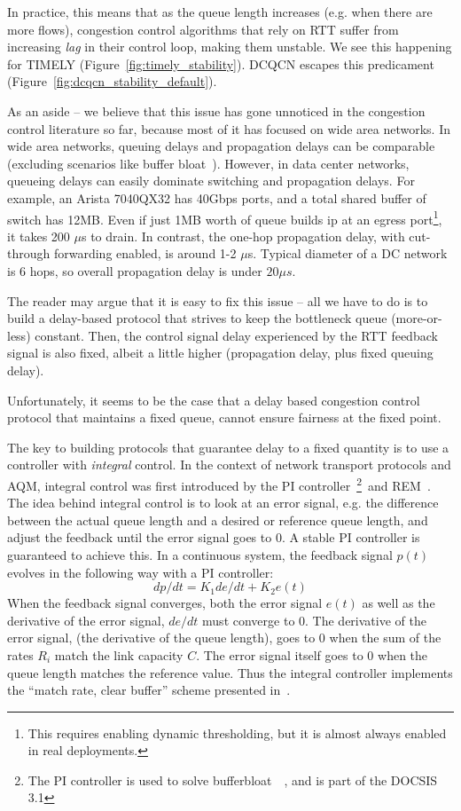In practice, this means that as the queue length increases (e.g. when there are
more flows), congestion control algorithms that rely on RTT suffer from
increasing {\em lag} in their control loop, making them unstable. We see this
happening for TIMELY (Figure~\ref{fig:timely_stability}). DCQCN escapes this
predicament (Figure~\ref{fig:dcqcn_stability_default}).

As an aside -- we believe that this issue has gone unnoticed in the congestion
control literature so far, because most of it has focused on wide area networks.
In wide area networks, queuing delays and propagation delays can be comparable
(excluding scenarios like buffer bloat~\cite{bufferbloat}). However, in data
center networks, queueing delays can easily dominate switching and
propagation delays.  For example, an Arista 7040QX32 has 40Gbps ports, and a
total shared buffer of switch has 12MB. Even if just 1MB worth of queue builds
ip at an egress port\footnote{This requires enabling dynamic thresholding, but it is
almost always enabled in real deployments.}, it takes 200 $\mu$s to drain. In contrast, the one-hop
propagation delay, with cut-through forwarding enabled, is around
1-2 $\mu$s.  Typical diameter of a DC network is 6 hops, so overall propagation
delay is under $20\mu s$.

The reader may argue that it is easy to fix this issue  -- all we have to do is
to build a delay-based protocol that strives to keep the  bottleneck queue
(more-or-less) constant. Then, the control signal delay experienced by the RTT
feedback signal is also fixed, albeit a little higher (propagation delay, plus
fixed queuing delay). 

Unfortunately, it seems to be the case that a delay based congestion control
protocol that maintains a fixed queue, cannot ensure fairness at the fixed point.

The key to building protocols that guarantee delay to a fixed quantity is to use
a controller with \emph{integral} control. In the context of network transport
protocols and AQM, integral control was first introduced by the PI
controller~\cite{hollot2001designing}\footnote{ The PI controller is 
used to solve
bufferbloat~\cite{conf/hpsr/PanNPPSBV13,bufferbloat-pi}~, and is part of
the DOCSIS 3.1}~and REM~\cite{REM}.  The idea behind integral control
is to look at an error signal, e.g. the difference between the actual queue
length and a desired or reference queue length, and adjust the feedback until
the error signal goes to 0. A stable PI controller is guaranteed to achieve
this. In a continuous system, the feedback signal $p(t)$ evolves in the
following way with a PI controller:
$$ {dp}/{dt} = K_1 {de}/{dt}+K_2e(t) $$
When the feedback signal converges, both the error signal $e(t)$ as
well as the derivative of the error signal, $de/dt$ must converge to
0. The derivative of the error signal, (the derivative of the queue length), goes to 0
when the sum of the rates $R_i$ match the link capacity $C$. The error signal itself goes to 0
when the queue length matches the reference value. Thus the integral
controller implements the ``match rate, clear buffer'' scheme
presented in~\cite{REM}. 

